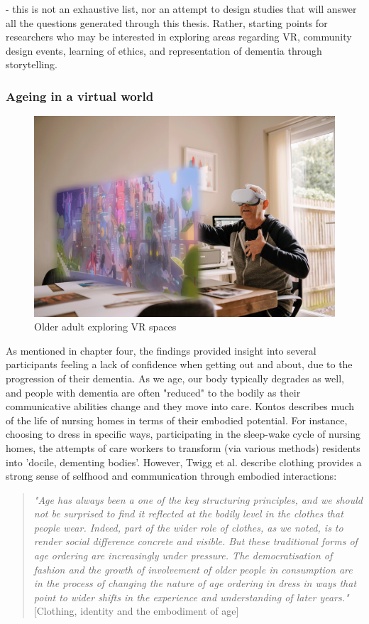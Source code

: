 - this is not an exhaustive list, nor an attempt to design studies that will answer all the questions generated through this thesis. Rather, starting points for researchers who may be interested in exploring areas regarding VR, community design events, learning of ethics, and representation of dementia through storytelling. 

\subsubsection{Ageing in a virtual world}
\label{FutureStudyOne}
\begin{figure}[htp]
\centering
\includegraphics[width=1\linewidth]{Images/Discussion/Aging_in_VR.png}
\caption{Older adult exploring VR spaces}
\label{fig:Aging_VR}
\end{figure}
As mentioned in chapter four, the findings provided insight into several participants feeling a lack of confidence when getting out and about, due to the progression of their dementia. As we age, our body typically degrades as well, and people with dementia are often "reduced" to the bodily as their communicative abilities change and they move into care. Kontos describes much of the life of nursing homes in terms of their embodied potential. For instance, choosing to dress in specific ways, participating in the sleep-wake cycle of nursing homes, the attempts of care workers to transform (via various methods) residents into 'docile, dementing bodies'. However, Twigg et al. describe clothing provides a strong sense of selfhood and communication through embodied interactions: 
\begin{quote}
\textit{"Age has always been a one of the key structuring principles, and we should not be surprised to find it reflected at the bodily level in the clothes that people wear. Indeed, part of the wider role of clothes, as we noted, is to render social difference concrete and visible. But these traditional forms of age ordering are increasingly under pressure. The democratisation of fashion and the growth of involvement of older people in consumption are in the process of changing the nature of age ordering in dress in ways that point to wider shifts in the experience and understanding of later years." }[Clothing, identity and the embodiment of age]
\end{quote}

